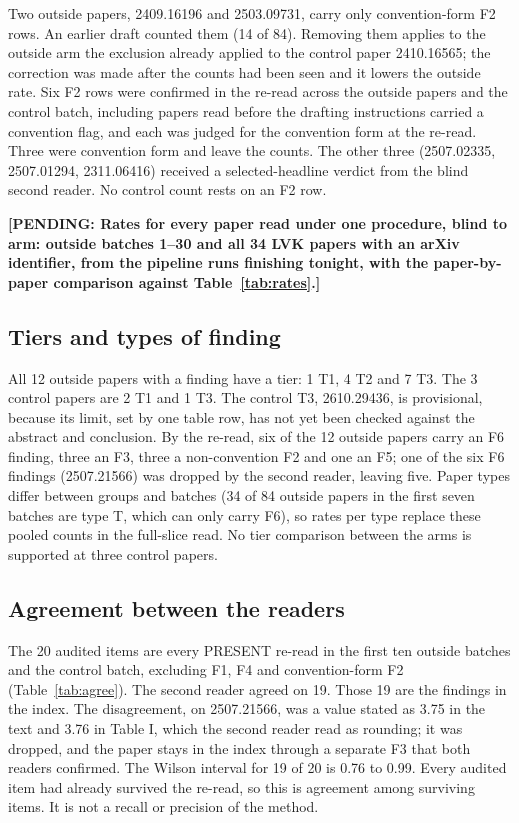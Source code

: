 \documentclass[reprint,amsmath,amssymb,aps,superscriptaddress,nofootinbib]{revtex4-2}
\newcommand{\pend}[1]{\textbf{[PENDING: #1]}}
\begin{document}
Two outside papers, 2409.16196 and 2503.09731, carry only convention-form F2 rows. An earlier draft counted them (14 of 84). Removing them applies to the outside arm the exclusion already applied to the control paper 2410.16565; the correction was made after the counts had been seen and it lowers the outside rate. Six F2 rows were confirmed in the re-read across the outside papers and the control batch, including papers read before the drafting instructions carried a convention flag, and each was judged for the convention form at the re-read. Three were convention form and leave the counts. The other three (2507.02335, 2507.01294, 2311.06416) received a selected-headline verdict from the blind second reader. No control count rests on an F2 row.

\pend{Rates for every paper read under one procedure, blind to arm: outside batches 1--30 and all 34 LVK papers with an arXiv identifier, from the pipeline runs finishing tonight, with the paper-by-paper comparison against Table~\ref{tab:rates}.}

\subsection{Tiers and types of finding}

All 12 outside papers with a finding have a tier: 1 T1, 4 T2 and 7 T3. The 3 control papers are 2 T1 and 1 T3. The control T3, 2610.29436, is provisional, because its limit, set by one table row, has not yet been checked against the abstract and conclusion. By the re-read, six of the 12 outside papers carry an F6 finding, three an F3, three a non-convention F2 and one an F5; one of the six F6 findings (2507.21566) was dropped by the second reader, leaving five. Paper types differ between groups and batches (34 of 84 outside papers in the first seven batches are type T, which can only carry F6), so rates per type replace these pooled counts in the full-slice read. No tier comparison between the arms is supported at three control papers.

\subsection{Agreement between the readers}

The 20 audited items are every PRESENT re-read in the first ten outside batches and the control batch, excluding F1, F4 and convention-form F2 (Table~\ref{tab:agree}). The second reader agreed on 19. Those 19 are the findings in the index. The disagreement, on 2507.21566, was a value stated as 3.75 in the text and 3.76 in Table I, which the second reader read as rounding; it was dropped, and the paper stays in the index through a separate F3 that both readers confirmed. The Wilson interval for 19 of 20 is 0.76 to 0.99. Every audited item had already survived the re-read, so this is agreement among surviving items. It is not a recall or precision of the method.
\end{document}
